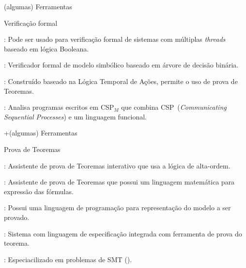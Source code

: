 \begin{frame}{(algumas) Ferramentas}\small
  \begin{block}{Verificação formal}
    \begin{description}
    \item<1,5>[\href{http://spinroot.com/spin/whatispin.html}{SPIN}]: Pode
      ser usado para verificação formal de sistemas com múltiplas
      \textit{threads} baseado em lógica Booleana.
    \item<2,5>[\href{http://nusmv.fbk.eu/}{NuSMV}]: Verificador formal de modelo simbólico
      baseado em árvore de decisão binária.
    \item<3,5>[\href{https://lamport.azurewebsites.net/tla/tla.html}{TLA$^+$}]: Construído
      baseado na Lógica Temporal de Ações, permite o uso de prova de Teoremas.
    \item<4,5>[\href{https://www.cs.ox.ac.uk/projects/fdr/}{FDR4}]: Analisa programas
      escritos em CSP$_M$ que combina CSP~(\textit{Communicating Sequential Processes})
      e um linguagem funcional.
    \end{description}
  \end{block}
\end{frame}


\begin{frame}{+(algumas) Ferramentas}\small
\begin{block}{Prova de Teoremas}
    \begin{description}
    \item<1,6>[\href{https://hol-theorem-prover.org/}{HOL}]: Assistente de prova de Teoremas
      interativo que usa a lógica de alta-ordem.
    \item<2,6>[\href{https://isabelle.in.tum.de/}{Isabelle}]: Assistente de prova de Teoremas
      que possui um linguagem matemática para expressão das fórmulas.
    \item<3,6>[\href{https://isabelle.in.tum.de/}{ACL2}]: Possui uma linguagem de programação
      para representação do modelo a ser provado.
    \item<4,6>[\href{http://pvs.csl.sri.com/}{PVS}]: Sistema com linguagem de especificação
      integrada com ferramenta de prova do teorema.
    \item<5,6>[\href{http://cvc4.cs.stanford.edu/web/}{CVC4}]: Especiacilizado em problemas
      de SMT ().
    \end{description}
  \end{block}
\end{frame}

